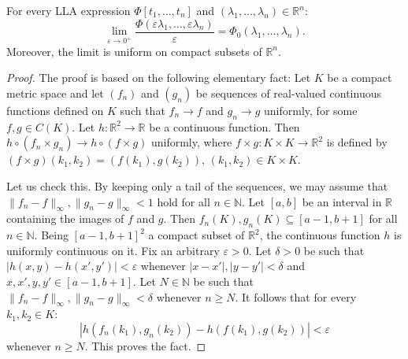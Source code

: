\documentclass[10pt,a4paper]{amsart}
\newcommand\N{\ensuremath{\mathbb{N}}}
\newcommand\R{\ensuremath{\mathbb{R}}}
\begin{document}
\begin{lem}\label{lem:lla_limit}
    For every LLA expression $\Phi [t_1,\ldots ,t_n]$ and $(\lambda
    _1,\ldots ,\lambda _n) \in \R^{n}$:
    \[
    \lim_{\varepsilon  \to 0^{+}}\frac{\Phi (\varepsilon \lambda
    _1,\ldots ,\varepsilon \lambda _n)}{\varepsilon }=\Phi _0 (\lambda
    _1,\ldots ,\lambda _n).
    \]
    Moreover, the limit is uniform on compact subsets of $\R^{n}$.
\end{lem}

\begin{proof}
    The proof is based on the following elementary fact:
    Let $K$ be a compact metric space and let $(f_n)$ and $(g_n)$ be
    sequences of real-valued continuous functions defined on $K$ such
    that $f_n\to f$ and $g_n\to g$ uniformly, for some $f,g \in C(K)$.
    Let $h\colon \R^2\to \R$ be a continuous function. Then $h\circ
    (f_n\times g_n)\to h\circ (f\times g)$ uniformly, where $f\times g
    \colon K\times K\to \R^2$ is defined by $(f\times
    g)(k_1,k_2)=(f(k_1),g(k_2))$, $(k_1,k_2)\in K\times K$.

    Let us check this. By keeping only a tail of the sequences, we may
    assume that $\|f_n-f\|_\infty, \|g_n-g\|_{\infty
    }<1$ hold for all $n \in \N$. Let $[a,b]$ be an interval in
    $\R$ containing the images of $f$ and $g$. Then
    $f_n(K),g_n(K)\subseteq [a-1,b+1]$ for all
    $n \in \N$. Being $[a-1,b+1 ]^2$ a compact
    subset of $\R^2$, the continuous function $h$ is uniformly
    continuous on it.
    Fix an arbitrary $\varepsilon >0$.
    Let $\delta >0$ be such that $|h(x,y)-h(x',y')|<\varepsilon $
    whenever $|x-x'|,|y-y'|<\delta $ and $x,x',y,y' \in [a-1,b+1]$.
    Let $N \in \N$ be such that $\|f_n-f\|_\infty, \|g_n-g\|_{\infty
    }<\delta $ whenever $n\ge N$. It follows that for every $k_1,k_2 \in K$:
    \[
        |h(f_n(k_1),g_n(k_2))-h(f(k_1),g(k_2))|<\varepsilon
    \]
    whenever $n\ge N$. This proves the fact.


\end{proof}
\end{document}
